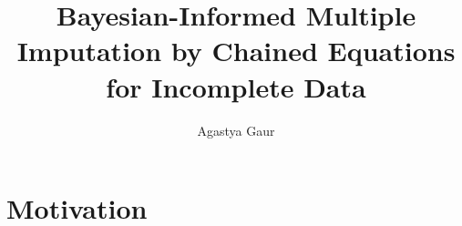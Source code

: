 \documentclass[preprint]{aastex631}
\begin{document}
\title{Bayesian-Informed Multiple Imputation by Chained Equations for Incomplete Data}
\author{Agastya Gaur}

\section{Motivation}



\citep{campbellFullyBayesianApproach2024}


\end{document}
